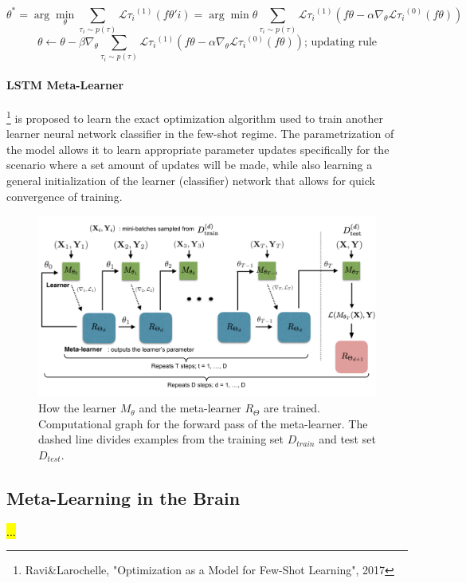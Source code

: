 \documentclass[main]{subfiles}
\begin{document}
%
\begin{equation}
     \theta^* = \arg\min_\theta \sum_{\tau_i \sim p(\tau)} \mathcal{L}{\tau_i}^{(1)} (f{\theta'i}) = \arg\min\theta \sum_{\tau_i \sim p(\tau)} \mathcal{L}{\tau_i}^{(1)} (f{\theta - \alpha\nabla_\theta \mathcal{L}{\tau_i}^{(0)}(f\theta)})
\end{equation}
%
\begin{equation}
    \theta \leftarrow \theta - \beta \nabla_{\theta} \sum_{\tau_i \sim p(\tau)} \mathcal{L}{\tau_i}^{(1)} (f{\theta - \alpha\nabla_\theta \mathcal{L}{\tau_i}^{(0)}(f\theta)})  \scriptstyle{\text{; updating rule}}
\end{equation}
%

\paragraph{LSTM Meta-Learner}\footnote{Ravi\&Larochelle, "Optimization as a Model for Few-Shot Learning", 2017} is proposed to learn the exact optimization algorithm used to train another learner neural network classifier in the few-shot regime. The parametrization of the model allows it to learn appropriate parameter updates specifically for the scenario where a set amount of updates will be made, while also learning a general initialization of the learner (classifier) network that allows for quick convergence of training.
%
\begin{figure}[H]
    \centering
    \includegraphics[width=0.8\linewidth]{14_ContinualMetaAndTransferLearning/figures/lstm-meta-learner.png}
    \caption{How the learner $M_\theta$ and the meta-learner $R_\Theta$ are trained. Computational graph for the forward pass of the meta-learner. The dashed line divides examples from the training set $D_{train}$ and test set $D_{test}$.}
    \label{fig:my_label}
\end{figure}



\subsection{Meta-Learning in the Brain}
\hl{...}
\end{document}
